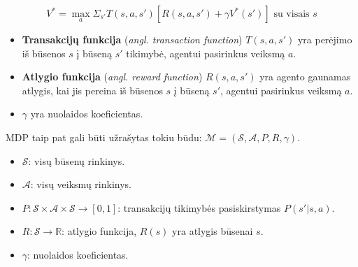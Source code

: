 \documentclass{VUMIFPSbakalaurinis}
\begin{document}
{	\begin{equation}\label{eq:bellmanOptimal}
		V^* = \max_a \Sigma_{s'}T(s, a, s')[R(s, a, s') + \gamma V^*(s')] \textrm{ su visais } s
	\end{equation} 
	
	\begin{itemize}
		\item \textbf{Transakcijų funkcija} (\textit{angl. transaction function}) \(T(s, a, s')\) yra perėjimo iš būsenos \(s\) į būseną \(s'\) tikimybė, agentui pasirinkus veiksmą \(a\).
		\item \textbf{Atlygio funkcija} (\textit{angl. reward function}) \(R(s, a, s')\) yra agento gaunamas atlygis, kai jis pereina iš būsenos \(s\) į būseną \(s'\), agentui pasirinkus veiksmą \(a\).
		\item \(\gamma\) yra nuolaidos koeficientas.
	\end{itemize}\par

	MDP taip pat gali būti užrašytas tokiu būdu: \(\mathcal{M} = (\mathcal{S}, \mathcal{A}, P, R, \gamma)\).
	\begin{itemize}
		\item \(\mathcal{S}\): visų būsenų rinkinys.
		\item \(\mathcal{A}\): visų veiksmų rinkinys.
		\item \(P : \mathcal{S} \times \mathcal{A} \times \mathcal{S} \rightarrow [0, 1]\): transakcijų tikimybės pasiskirstymas \(P(s'|s, a)\).
		\item \(R : \mathcal{S} \rightarrow \mathbb{R}\): atlygio funkcija, \(R(s)\) yra atlygis būsenai \(s\).
		\item \(\gamma\): nuolaidos koeficientas.
	\end{itemize}
}
\end{document}
